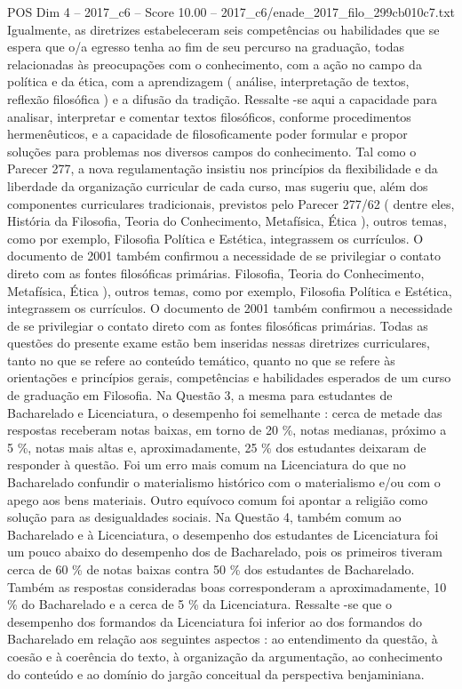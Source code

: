 \begin{textsample}{POS Dim 4 – 2017\_c6 – Score 10.00 – 2017\_c6/enade\_2017\_filo\_299cb010c7.txt}
Igualmente, as diretrizes estabeleceram seis competências ou habilidades que se espera que o/a egresso tenha ao fim de seu percurso na graduação, todas relacionadas às preocupações com o conhecimento, com a ação no campo da política e da ética, com a aprendizagem ( análise, interpretação de textos, reflexão filosófica ) e a difusão da tradição.
Ressalte -se aqui a capacidade para analisar, interpretar e comentar textos filosóficos, conforme procedimentos hermenêuticos, e a capacidade de filosoficamente poder formular e propor soluções para problemas nos diversos campos do conhecimento.
Tal como o Parecer 277, a nova regulamentação insistiu nos princípios da flexibilidade e da liberdade da organização curricular de cada curso, mas sugeriu que, além dos componentes curriculares tradicionais, previstos pelo Parecer 277/62 ( dentre eles, História da Filosofia, Teoria do Conhecimento, Metafísica, Ética ), outros temas, como por exemplo, Filosofia Política e Estética, integrassem os currículos.
O documento de 2001 também confirmou a necessidade de se privilegiar o contato direto com as fontes filosóficas primárias.
Filosofia, Teoria do Conhecimento, Metafísica, Ética ), outros temas, como por exemplo, Filosofia Política e Estética, integrassem os currículos.
O documento de 2001 também confirmou a necessidade de se privilegiar o contato direto com as fontes filosóficas primárias.
Todas as questões do presente exame estão bem inseridas nessas diretrizes curriculares, tanto no que se refere ao conteúdo temático, quanto no que se refere às orientações e princípios gerais, competências e habilidades esperados de um curso de graduação em Filosofia.
Na Questão 3, a mesma para estudantes de Bacharelado e Licenciatura, o desempenho foi semelhante : cerca de metade das respostas receberam notas baixas, em torno de 20 \%, notas medianas, próximo a 5 \%, notas mais altas e, aproximadamente, 25 \% dos estudantes deixaram de responder à questão.
Foi um erro mais comum na Licenciatura do que no Bacharelado confundir o materialismo histórico com o materialismo e/ou com o apego aos bens materiais.
Outro equívoco comum foi apontar a religião como solução para as desigualdades sociais.
Na Questão 4, também comum ao Bacharelado e à Licenciatura, o desempenho dos estudantes de Licenciatura foi um pouco abaixo do desempenho dos de Bacharelado, pois os primeiros tiveram cerca de 60 \% de notas baixas contra 50 \% dos estudantes de Bacharelado.
Também as respostas consideradas boas corresponderam a aproximadamente, 10 \% do Bacharelado e a cerca de 5 \% da Licenciatura.
Ressalte -se que o desempenho dos formandos da Licenciatura foi inferior ao dos formandos do Bacharelado em relação aos seguintes aspectos : ao entendimento da questão, à coesão e à coerência do texto, à organização da argumentação, ao conhecimento do conteúdo e ao domínio do jargão conceitual da perspectiva benjaminiana.

\end{textsample}
